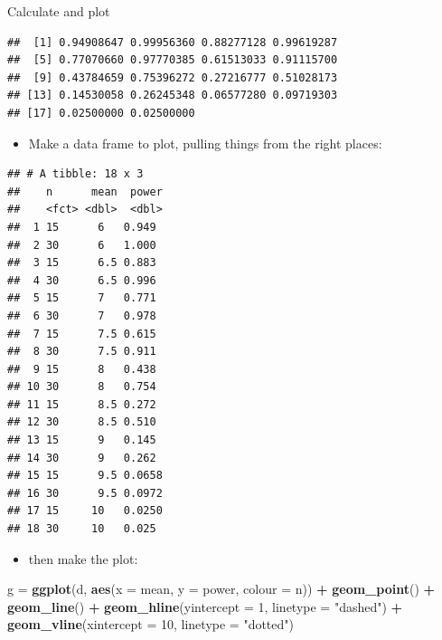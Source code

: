 \documentclass[ignorenonframetext,]{beamer}
\newenvironment{Shaded}{\begin{snugshade}}{\end{snugshade}}
\newcommand{\DataTypeTok}[1]{\textcolor[rgb]{0.13,0.29,0.53}{#1}}
\newcommand{\DecValTok}[1]{\textcolor[rgb]{0.00,0.00,0.81}{#1}}
\newcommand{\KeywordTok}[1]{\textcolor[rgb]{0.13,0.29,0.53}{\textbf{#1}}}
\newcommand{\NormalTok}[1]{#1}
\newcommand{\OperatorTok}[1]{\textcolor[rgb]{0.81,0.36,0.00}{\textbf{#1}}}
\newcommand{\StringTok}[1]{\textcolor[rgb]{0.31,0.60,0.02}{#1}}
\providecommand{\tightlist}{%
  \setlength{\itemsep}{0pt}\setlength{\parskip}{0pt}}
\begin{document}
\begin{frame}[fragile]{Calculate and plot}
\begin{verbatim}
##  [1] 0.94908647 0.99956360 0.88277128 0.99619287
##  [5] 0.77070660 0.97770385 0.61513033 0.91115700
##  [9] 0.43784659 0.75396272 0.27216777 0.51028173
## [13] 0.14530058 0.26245348 0.06577280 0.09719303
## [17] 0.02500000 0.02500000
\end{verbatim}

\begin{itemize}
\tightlist
\item
  Make a data frame to plot, pulling things from the right places:
\end{itemize}

\begin{Shaded}
\end{Shaded}

\begin{verbatim}
## # A tibble: 18 x 3
##    n      mean  power
##    <fct> <dbl>  <dbl>
##  1 15      6   0.949 
##  2 30      6   1.000 
##  3 15      6.5 0.883 
##  4 30      6.5 0.996 
##  5 15      7   0.771 
##  6 30      7   0.978 
##  7 15      7.5 0.615 
##  8 30      7.5 0.911 
##  9 15      8   0.438 
## 10 30      8   0.754 
## 11 15      8.5 0.272 
## 12 30      8.5 0.510 
## 13 15      9   0.145 
## 14 30      9   0.262 
## 15 15      9.5 0.0658
## 16 30      9.5 0.0972
## 17 15     10   0.0250
## 18 30     10   0.025
\end{verbatim}

\begin{itemize}
\tightlist
\item
  then make the plot:
\end{itemize}

\begin{Shaded}
\begin{Highlighting}[]
\NormalTok{g =}\StringTok{ }\KeywordTok{ggplot}\NormalTok{(d, }\KeywordTok{aes}\NormalTok{(}\DataTypeTok{x =}\NormalTok{ mean, }\DataTypeTok{y =}\NormalTok{ power, }\DataTypeTok{colour =}\NormalTok{ n)) }\OperatorTok{+}
\StringTok{  }\KeywordTok{geom_point}\NormalTok{() }\OperatorTok{+}\StringTok{ }\KeywordTok{geom_line}\NormalTok{() }\OperatorTok{+}
\StringTok{  }\KeywordTok{geom_hline}\NormalTok{(}\DataTypeTok{yintercept =} \DecValTok{1}\NormalTok{, }\DataTypeTok{linetype =} \StringTok{"dashed"}\NormalTok{) }\OperatorTok{+}
\StringTok{  }\KeywordTok{geom_vline}\NormalTok{(}\DataTypeTok{xintercept =} \DecValTok{10}\NormalTok{, }\DataTypeTok{linetype =} \StringTok{"dotted"}\NormalTok{)}
\end{Highlighting}
\end{Shaded}

\end{frame}
\end{document}
